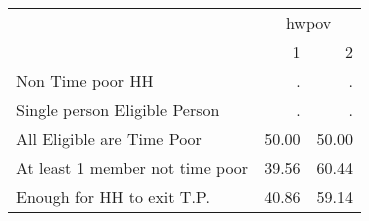 \documentclass{article}
\begin{document}
\begin{table}[!h]
\centering
\begin{tabular}{lll}
\cline{1-3}
\multicolumn{1}{c}{} &
  \multicolumn{2}{|c}{hwpov} \\
\multicolumn{1}{c}{} &
  \multicolumn{1}{|r}{1} &
  \multicolumn{1}{r}{2} \\
\cline{1-3}
\multicolumn{1}{l}{Non Time poor HH} &
  \multicolumn{1}{|r}{.} &
  \multicolumn{1}{r}{.} \\
\multicolumn{1}{l}{Single person Eligible Person} &
  \multicolumn{1}{|r}{.} &
  \multicolumn{1}{r}{.} \\
\multicolumn{1}{l}{All Eligible are Time Poor} &
  \multicolumn{1}{|r}{50.00} &
  \multicolumn{1}{r}{50.00} \\
\multicolumn{1}{l}{At least 1 member not time poor} &
  \multicolumn{1}{|r}{39.56} &
  \multicolumn{1}{r}{60.44} \\
\multicolumn{1}{l}{Enough for HH to exit T.P.} &
  \multicolumn{1}{|r}{40.86} &
  \multicolumn{1}{r}{59.14} \\
\cline{1-3}
\end{tabular}
\end{table}
\end{document}
